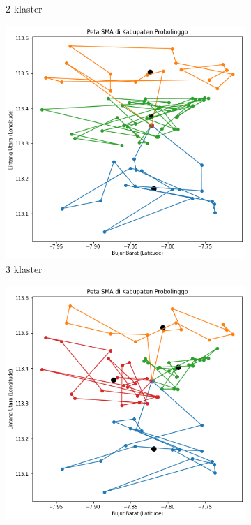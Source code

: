 \begin{frame}
\begin{figure}
\begin{subfigure}[h]{0.2\textwidth}
		\caption{2 klaster}
		\end{subfigure}
		\hfill
		\begin{subfigure}[h]{0.2\textwidth}
		\includegraphics[width=\textwidth]{gambar/hasil_mtsp/3}
		\caption{3 klaster}
		\end{subfigure}
		\hfill
		\begin{subfigure}[h]{0.2\textwidth}
		\includegraphics[width=\textwidth]{gambar/hasil_mtsp/4}

\end{subfigure}
\end{figure}
\end{frame}
